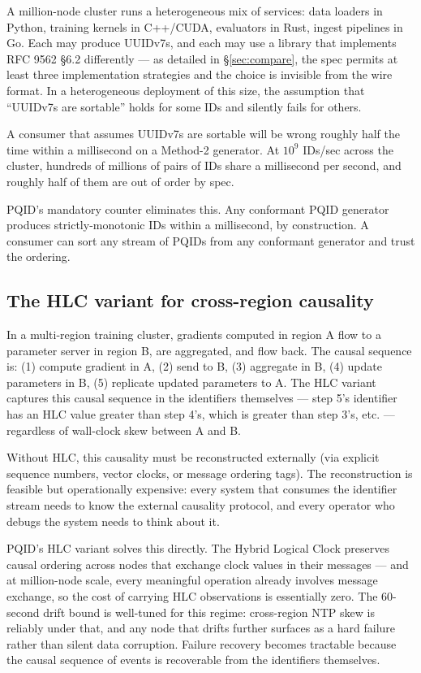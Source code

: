 A million-node cluster runs a heterogeneous mix of services: data loaders in Python, training kernels in C++/CUDA, evaluators in Rust, ingest pipelines in Go. Each may produce UUIDv7s, and each may use a library that implements RFC 9562 §6.2 differently --- as detailed in §\ref{sec:compare}, the spec permits at least three implementation strategies and the choice is invisible from the wire format. In a heterogeneous deployment of this size, the assumption that ``UUIDv7s are sortable'' holds for some IDs and silently fails for others.

A consumer that assumes UUIDv7s are sortable will be wrong roughly half the time within a millisecond on a Method-2 generator. At $10^9$ IDs/sec across the cluster, hundreds of millions of pairs of IDs share a millisecond per second, and roughly half of them are out of order by spec.

PQID's mandatory counter eliminates this. Any conformant PQID generator produces strictly-monotonic IDs within a millisecond, by construction. A consumer can sort any stream of PQIDs from any conformant generator and trust the ordering.

\subsection{The HLC variant for cross-region causality}

In a multi-region training cluster, gradients computed in region A flow to a parameter server in region B, are aggregated, and flow back. The causal sequence is: (1) compute gradient in A, (2) send to B, (3) aggregate in B, (4) update parameters in B, (5) replicate updated parameters to A. The HLC variant captures this causal sequence in the identifiers themselves --- step 5's identifier has an HLC value greater than step 4's, which is greater than step 3's, etc. --- regardless of wall-clock skew between A and B.

Without HLC, this causality must be reconstructed externally (via explicit sequence numbers, vector clocks, or message ordering tags). The reconstruction is feasible but operationally expensive: every system that consumes the identifier stream needs to know the external causality protocol, and every operator who debugs the system needs to think about it.

PQID's HLC variant solves this directly. The Hybrid Logical Clock \citep{kulkarni2014hlc} preserves causal ordering across nodes that exchange clock values in their messages --- and at million-node scale, every meaningful operation already involves message exchange, so the cost of carrying HLC observations is essentially zero. The 60-second drift bound is well-tuned for this regime: cross-region NTP skew is reliably under that, and any node that drifts further surfaces as a hard failure rather than silent data corruption. Failure recovery becomes tractable because the causal sequence of events is recoverable from the identifiers themselves.

